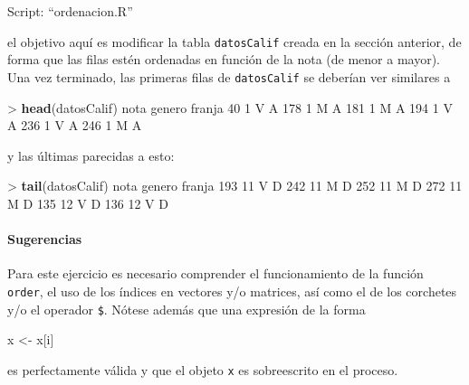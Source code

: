 \documentclass[]{article}
\newenvironment{Shaded}{}{}
\newcommand{\KeywordTok}[1]{\textcolor[rgb]{0.00,0.44,0.13}{\textbf{{#1}}}}
\newcommand{\DecValTok}[1]{\textcolor[rgb]{0.25,0.63,0.44}{{#1}}}
\newcommand{\NormalTok}[1]{{#1}}
\begin{document}
Script: ``ordenacion.R''

el objetivo aquí es modificar la tabla \texttt{datosCalif} creada en la
sección anterior, de forma que las filas estén ordenadas en función de
la nota (de menor a mayor). Una vez terminado, las primeras filas de
\texttt{datosCalif} se deberían ver similares a

\begin{Shaded}
\begin{Highlighting}[]
\NormalTok{> }\KeywordTok{head}\NormalTok{(datosCalif)}
    \NormalTok{nota genero franja}
\DecValTok{40}     \DecValTok{1}      \NormalTok{V      A}
\DecValTok{178}    \DecValTok{1}      \NormalTok{M      A}
\DecValTok{181}    \DecValTok{1}      \NormalTok{M      A}
\DecValTok{194}    \DecValTok{1}      \NormalTok{V      A}
\DecValTok{236}    \DecValTok{1}      \NormalTok{V      A}
\DecValTok{246}    \DecValTok{1}      \NormalTok{M      A}
\end{Highlighting}
\end{Shaded}
y las últimas parecidas a esto:

\begin{Shaded}
\begin{Highlighting}[]
\NormalTok{> }\KeywordTok{tail}\NormalTok{(datosCalif)}
    \NormalTok{nota genero franja}
\DecValTok{193}   \DecValTok{11}      \NormalTok{V      D}
\DecValTok{242}   \DecValTok{11}      \NormalTok{M      D}
\DecValTok{252}   \DecValTok{11}      \NormalTok{M      D}
\DecValTok{272}   \DecValTok{11}      \NormalTok{M      D}
\DecValTok{135}   \DecValTok{12}      \NormalTok{V      D}
\DecValTok{136}   \DecValTok{12}      \NormalTok{V      D}
\end{Highlighting}
\end{Shaded}
\paragraph{Sugerencias}

Para este ejercicio es necesario comprender el funcionamiento de la
función \texttt{order}, el uso de los índices en vectores y/o matrices,
así como el de los corchetes y/o el operador \texttt{\$}. Nótese además
que una expresión de la forma

\begin{Shaded}
\begin{Highlighting}[]
\NormalTok{x <- x[i]}
\end{Highlighting}
\end{Shaded}
es perfectamente válida y que el objeto \texttt{x} es sobreescrito en el
proceso.
\end{document}
